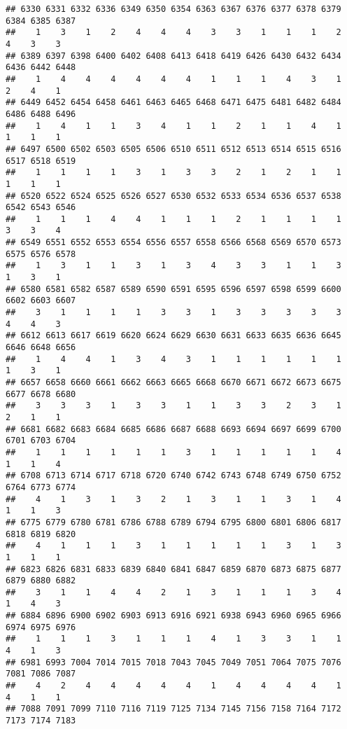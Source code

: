 \documentclass[
]{article}
\begin{document}
\begin{verbatim}
## 6330 6331 6332 6336 6349 6350 6354 6363 6367 6376 6377 6378 6379 6384 6385 6387 
##    1    3    1    2    4    4    4    3    3    1    1    1    2    4    3    3 
## 6389 6397 6398 6400 6402 6408 6413 6418 6419 6426 6430 6432 6434 6436 6442 6448 
##    1    4    4    4    4    4    4    1    1    1    4    3    1    2    4    1 
## 6449 6452 6454 6458 6461 6463 6465 6468 6471 6475 6481 6482 6484 6486 6488 6496 
##    1    4    1    1    3    4    1    1    2    1    1    4    1    1    1    1 
## 6497 6500 6502 6503 6505 6506 6510 6511 6512 6513 6514 6515 6516 6517 6518 6519 
##    1    1    1    1    3    1    3    3    2    1    2    1    1    1    1    1 
## 6520 6522 6524 6525 6526 6527 6530 6532 6533 6534 6536 6537 6538 6542 6543 6546 
##    1    1    1    4    4    1    1    1    2    1    1    1    1    3    3    4 
## 6549 6551 6552 6553 6554 6556 6557 6558 6566 6568 6569 6570 6573 6575 6576 6578 
##    1    3    1    1    3    1    3    4    3    3    1    1    3    1    3    1 
## 6580 6581 6582 6587 6589 6590 6591 6595 6596 6597 6598 6599 6600 6602 6603 6607 
##    3    1    1    1    1    3    3    1    3    3    3    3    3    4    4    3 
## 6612 6613 6617 6619 6620 6624 6629 6630 6631 6633 6635 6636 6645 6646 6648 6656 
##    1    4    4    1    3    4    3    1    1    1    1    1    1    1    3    1 
## 6657 6658 6660 6661 6662 6663 6665 6668 6670 6671 6672 6673 6675 6677 6678 6680 
##    3    3    3    1    3    3    1    1    3    3    2    3    1    2    1    1 
## 6681 6682 6683 6684 6685 6686 6687 6688 6693 6694 6697 6699 6700 6701 6703 6704 
##    1    1    1    1    1    1    3    1    1    1    1    1    4    1    1    4 
## 6708 6713 6714 6717 6718 6720 6740 6742 6743 6748 6749 6750 6752 6764 6773 6774 
##    4    1    3    1    3    2    1    3    1    1    3    1    4    1    1    3 
## 6775 6779 6780 6781 6786 6788 6789 6794 6795 6800 6801 6806 6817 6818 6819 6820 
##    4    1    1    1    3    1    1    1    1    1    3    1    3    1    1    1 
## 6823 6826 6831 6833 6839 6840 6841 6847 6859 6870 6873 6875 6877 6879 6880 6882 
##    3    1    1    4    4    2    1    3    1    1    1    3    4    1    4    3 
## 6884 6896 6900 6902 6903 6913 6916 6921 6938 6943 6960 6965 6966 6974 6975 6976 
##    1    1    1    3    1    1    1    4    1    3    3    1    1    4    1    3 
## 6981 6993 7004 7014 7015 7018 7043 7045 7049 7051 7064 7075 7076 7081 7086 7087 
##    4    2    4    4    4    4    4    1    4    4    4    4    1    4    1    1 
## 7088 7091 7099 7110 7116 7119 7125 7134 7145 7156 7158 7164 7172 7173 7174 7183 

\end{verbatim}
\end{document}
